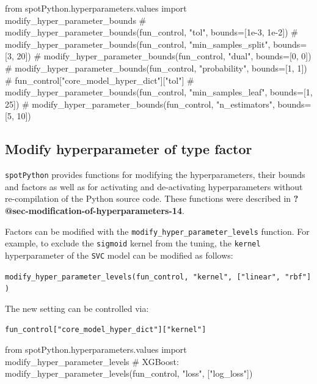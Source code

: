 \documentclass[
  letterpaper,
  DIV=11,
  numbers=noendperiod]{scrreprt}
\newenvironment{Shaded}{\begin{snugshade}}{\end{snugshade}}
\newcommand{\CommentTok}[1]{\textcolor[rgb]{0.37,0.37,0.37}{#1}}
\newcommand{\ImportTok}[1]{\textcolor[rgb]{0.00,0.46,0.62}{#1}}
\newcommand{\NormalTok}[1]{\textcolor[rgb]{0.00,0.23,0.31}{#1}}
\newcommand{\StringTok}[1]{\textcolor[rgb]{0.13,0.47,0.30}{#1}}
\begin{document}
\begin{Shaded}
\begin{Highlighting}[]
\ImportTok{from}\NormalTok{ spotPython.hyperparameters.values }\ImportTok{import}\NormalTok{ modify\_hyper\_parameter\_bounds}
\CommentTok{\# modify\_hyper\_parameter\_bounds(fun\_control, "tol", bounds=[1e{-}3, 1e{-}2])}
\CommentTok{\# modify\_hyper\_parameter\_bounds(fun\_control, "min\_samples\_split", bounds=[3, 20])}
\CommentTok{\# modify\_hyper\_parameter\_bounds(fun\_control, "dual", bounds=[0, 0])}
\CommentTok{\# modify\_hyper\_parameter\_bounds(fun\_control, "probability", bounds=[1, 1])}
\CommentTok{\# fun\_control["core\_model\_hyper\_dict"]["tol"]}
\CommentTok{\# modify\_hyper\_parameter\_bounds(fun\_control, "min\_samples\_leaf", bounds=[1, 25])}
\CommentTok{\# modify\_hyper\_parameter\_bounds(fun\_control, "n\_estimators", bounds=[5, 10])}
\end{Highlighting}
\end{Shaded}

\hypertarget{modify-hyperparameter-of-type-factor-2}{%
\subsection{Modify hyperparameter of type
factor}\label{modify-hyperparameter-of-type-factor-2}}

\texttt{spotPython} provides functions for modifying the
hyperparameters, their bounds and factors as well as for activating and
de-activating hyperparameters without re-compilation of the Python
source code. These functions were described in
\textbf{?@sec-modification-of-hyperparameters-14}.

Factors can be modified with the
\texttt{modify\_hyper\_parameter\_levels} function. For example, to
exclude the \texttt{sigmoid} kernel from the tuning, the \texttt{kernel}
hyperparameter of the \texttt{SVC} model can be modified as follows:

\texttt{modify\_hyper\_parameter\_levels(fun\_control,\ "kernel",\ {[}"linear",\ "rbf"{]})}

The new setting can be controlled via:

\texttt{fun\_control{[}"core\_model\_hyper\_dict"{]}{[}"kernel"{]}}

\begin{Shaded}
\begin{Highlighting}[]
\ImportTok{from}\NormalTok{ spotPython.hyperparameters.values }\ImportTok{import}\NormalTok{ modify\_hyper\_parameter\_levels}
\CommentTok{\# XGBoost:}
\NormalTok{modify\_hyper\_parameter\_levels(fun\_control, }\StringTok{"loss"}\NormalTok{, [}\StringTok{"log\_loss"}\NormalTok{])}
\end{Highlighting}
\end{Shaded}
\end{document}
